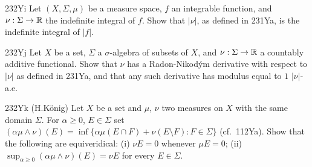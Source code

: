{\spheader 232Yi Let $(X,\Sigma,\mu)$ be a measure space, $f$ an
integrable function, and $\nu:\Sigma\to\Bbb R$ the indefinite integral
of $f$.   Show that $|\nu|$, as defined in 231Ya, is the
indefinite integral of $|f|$.

\spheader 232Yj Let $X$ be a set, $\Sigma$ a $\sigma$-algebra of subsets
of $X$, and $\nu:\Sigma\to\Bbb R$ a countably additive functional.
Show that $\nu$ has a Radon-Nikod\'ym
derivative with respect to $|\nu|$ as defined in 231Ya, and that any
such derivative has modulus equal to $1\,\,|\nu|$-a.e.

\spheader 232Yk (H.K\"onig)
Let $X$ be a set and $\mu$, $\nu$ two measures on $X$ with
the same domain $\Sigma$.   For $\alpha\ge 0$, $E\in\Sigma$ set
$(\alpha\mu\wedge\nu)(E)
=\inf\{\alpha\mu(E\cap F)+\nu(E\setminus F):F\in\Sigma\}$ (cf.\
112Ya).
Show that the following are equiveridical:  (i) $\nu E=0$ whenever
$\mu E=0$;  (ii) $\sup_{\alpha\ge 0}(\alpha\mu\wedge\nu)(E)=\nu E$ for
every $E\in\Sigma$.
}%

